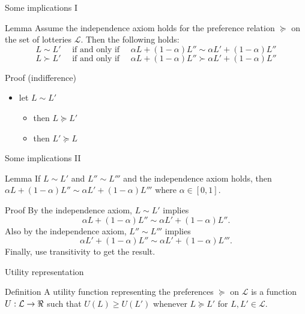 \documentclass[bigger]{beamer}
\begin{document}
\begin{frame}[label={sec:org968b7a9}]{Some implications I}
\begin{block}{Lemma}
Assume the independence axiom holds for the preference relation \(\succeq\) on the set of lotteries \(\mathcal{L}\). Then the following holds:
$$L\sim L' \quad\text{ if and only if }\quad \alpha L+(1-\alpha) L''\sim \alpha L'+(1-\alpha) L''$$
$$L\succ L' \quad\text{ if and only if }\quad \alpha L+(1-\alpha) L''\succ \alpha L'+(1-\alpha) L''$$
\end{block}
\begin{block}{Proof (indifference)}
\begin{itemize}
\item let \(L\sim L'\)
\begin{itemize}
\item then \(L\succeq L'\)
\vspace*{0.5cm}
\item then \(L'\succeq L\)
\vspace*{0.5cm}
\end{itemize}
\end{itemize}
\end{block}
\end{frame}

\begin{frame}[label={sec:org8bee8e3}]{Some implications II}
\begin{block}{Lemma}
If \(L\sim L'\) and \(L''\sim L'''\) and the independence axiom holds, then \(\alpha L + (1-\alpha)L''\sim \alpha L' + (1-\alpha)L'''\) where \(\alpha\in [0,1]\).
\end{block}
\begin{block}{Proof}
   By the independence axiom, \(L\sim L'\) implies
$$\alpha L+ (1-\alpha) L''\sim \alpha L'+(1-\alpha) L''.$$
Also by the independence axiom, \(L''\sim L'''\) implies 
$$\alpha L'+ (1-\alpha) L''\sim \alpha L'+(1-\alpha) L'''.$$
Finally, use transitivity to get the result.
\end{block}
\end{frame}

\begin{frame}[label={sec:org800dd39}]{Utility representation}
\begin{block}{Definition}
A utility function representing the preferences \(\succeq\) on \(\mathcal{L}\) is a function \(U:\mathcal{L}\rightarrow \Re\) such that \(U(L)\geq U(L')\) whenever \(L\succeq L'\) for \(L,L'\in\mathcal{L}\).
\end{block}
\end{frame}
\end{document}
